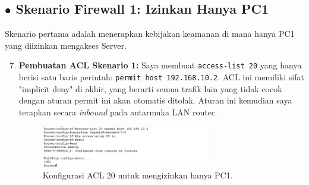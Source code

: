 \subsection*{$\bullet$ Skenario Firewall 1: Izinkan Hanya PC1}
Skenario pertama adalah menerapkan kebijakan keamanan di mana hanya PC1 yang diizinkan mengakses Server.
\begin{enumerate}
    \setcounter{enumi}{6}
    \item \textbf{Pembuatan ACL Skenario 1:} Saya membuat \texttt{access-list 20} yang hanya berisi satu baris perintah: \texttt{permit host 192.168.10.2}. ACL ini memiliki sifat "implicit deny" di akhir, yang berarti semua trafik lain yang tidak cocok dengan aturan permit ini akan otomatis ditolak. Aturan ini kemudian saya terapkan secara \textit{inbound} pada antarmuka LAN router.
    \begin{figure}[H]
        \centering
        \includegraphics[width=0.7\textwidth]{img4/CiscACL20.jpeg}
        \caption{Konfigurasi ACL 20 untuk mengizinkan hanya PC1.}
    \end{figure}
    

\end{enumerate}
